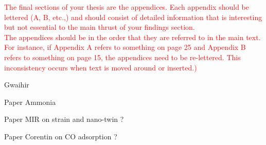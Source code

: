 \textcolor{red}{The final sections of your thesis are the appendices. Each appendix should be lettered (A, B, etc.,) and should consist of detailed information that is interesting but not essential to the main thrust of your findings section.\\
The appendices should be in the order that they are referred to in the main text. For instance, if Appendix A refers to something on page 25 and Appendix B refers to something on page 15, the appendices need to be re-lettered. This inconsistency occurs when text is moved around or inserted.)}


Gwaihir

Paper Ammonia

Paper MIR on strain and nano-twin ?

Paper Corentin on CO adsorption ?
